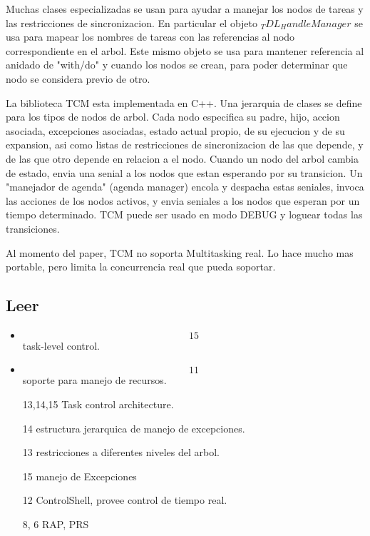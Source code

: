 Muchas clases especializadas se usan para ayudar a manejar los nodos
de tareas y las restricciones de sincronizacion. En particular
el objeto $_TDL_HandleManager$ se usa para mapear los nombres de tareas con
las referencias al nodo correspondiente en el arbol.
Este mismo objeto se usa para mantener referencia al anidado de "with/do" y
cuando los nodos se crean, para poder determinar que nodo se
considera previo de otro.

La biblioteca TCM esta implementada en C++. Una jerarquia de clases se
define para los tipos de nodos de arbol.
Cada nodo especifica su padre, hijo, accion asociada, excepciones asociadas,
estado actual propio, de su ejecucion y de su expansion, asi como listas de
restricciones de sincronizacion de las que depende, y de las que otro 
depende en relacion a el nodo.
Cuando un nodo del arbol cambia de estado, envia una senial a los nodos
que estan esperando por su transicion.
Un "manejador de agenda" (agenda manager) encola y despacha estas seniales,
invoca las acciones de los nodos activos, y envia seniales a los nodos
que esperan por un tiempo determinado.
TCM puede ser usado en modo DEBUG y loguear todas las transiciones.

Al momento del paper, TCM no soporta Multitasking real. 
Lo hace mucho mas portable, pero limita la concurrencia real que pueda
soportar.


\subsection{Leer}

\begin{itemize}
\item \[15\] task-level control.
\item \[11\] soporte para manejo de recursos.
\item [13,14,15] Task control architecture.
\item [14] estructura jerarquica de manejo de excepciones.
\item [13] restricciones a diferentes niveles del arbol.
\item [15] manejo de Excepciones
\item [12] ControlShell, provee control de tiempo real.
\item [8, 6] RAP, PRS
\end{itemize}

